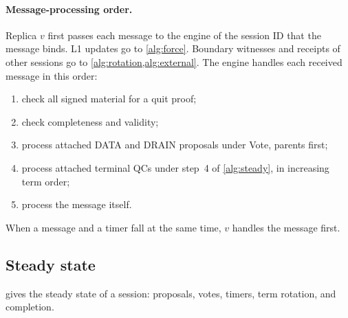\documentclass[11pt,a4paper]{article}
\newcommand{\RR}[1]{{\color{rrRed}#1}}
\newif\ifrevmarks
\newcommand{\Rv}[1]{\ifrevmarks\leavevmode{\color{rvBlue}#1}\else#1\fi}
\begin{document}
\paragraph{Message-processing order.}\leavevmode
\RR{Replica $v$ first passes each message to the engine of the session
\Rv{ID} that the message binds. L1 updates go to \cref{alg:force}. Boundary witnesses and receipts of
other sessions go to \cref{alg:rotation,alg:external}.} The engine handles each received
message in this order:
\begin{enumerate}[label=(\arabic*)]
\item check all signed material for a quit proof;
\item check completeness and validity;
\item process attached DATA \RR{and DRAIN} proposals under Vote, parents
first;
\item process attached terminal QCs under step~4 of \cref{alg:steady},
in increasing term order;
\item process the message itself.
\end{enumerate}
When a message and a timer fall at the same time, $v$ handles the
message first.

\subsection{Steady state}
\label{sec:steady}
 gives the steady state of a session: proposals, votes,
timers, term rotation, and completion.
\end{document}
